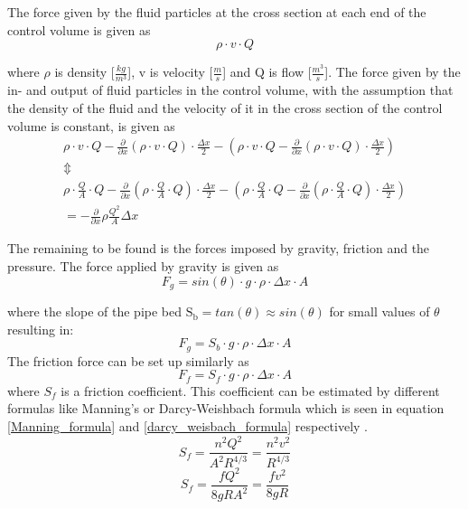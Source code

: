 The force given by the fluid particles at the cross section at each end of the control volume is given as
\begin{equation}
	\rho \cdot v \cdot Q
\end{equation}

where $\rho$ is density [$\frac{kg}{m^3}$], v is velocity [$\frac{m}{s}$] and Q is flow [$\frac{m^3}{s}$].
The force given by the in- and output of fluid particles in the control volume, with the assumption that the density of the fluid and the velocity of it in the cross section of the control volume is constant, is given as
\begin{equation}
\begin{array}{l}
\rho \cdot v \cdot Q - \frac{\partial}{\partial x}(\rho \cdot v \cdot Q) \cdot \frac{\Delta x}{2} - \left(\rho \cdot v \cdot Q - \frac{\partial}{\partial x}(\rho \cdot v \cdot Q) \cdot \frac{\Delta x}{2} \right) \\
\Updownarrow \\
\rho \cdot \frac{Q}{A} \cdot Q - \frac{\partial}{\partial x}(\rho \cdot \frac{Q}{A}  \cdot Q) \cdot \frac{\Delta x}{2} - \left(\rho \cdot \frac{Q}{A}  \cdot Q - \frac{\partial}{\partial x}(\rho \cdot \frac{Q}{A}  \cdot Q) \cdot \frac{\Delta x}{2} \right) \\
= - \frac{\partial}{\partial x} \rho \frac{Q^2}{A}\Delta x
\end{array}
\label{mass_flow_speed}
\end{equation}

The remaining to be found is the forces imposed by gravity, friction and the pressure.
The force applied by gravity is given as
\begin{equation}
F_g = sin(\theta)\cdot g \cdot \rho \cdot \Delta x \cdot A
\label{gravity_force} 
\end{equation}

where the slope of the pipe bed $\text{S}_\text{b} = tan(\theta) \approx sin(\theta)$ for small values of $\theta$ resulting in:
\begin{equation}
F_g = S_b \cdot g \cdot \rho \cdot \Delta x \cdot A 
\end{equation}
The friction force can be set up similarly as
\begin{equation}
F_f = S_f \cdot g \cdot \rho \cdot \Delta x \cdot A 
\label{friction_force} 
\end{equation}
where $S_f$ is a friction coefficient. This coefficient can be estimated by different formulas like Manning's or Darcy-Weishbach formula which is seen in equation \ref{Manning_formula} and \ref{darcy_weisbach_formula} respectively . 
\begin{equation}
	S_f = \frac{n^2 Q^2}{A^2R^{4/3}}= \frac{n^2 v^2}{R^{4/3}}
\label{Manning_formula}
\end{equation}
\begin{equation}
	S_f = \frac{f Q^2}{8gR A^2}= \frac{f v^2}{8gR}
\label{darcy_weisbach_formula}
\end{equation}

